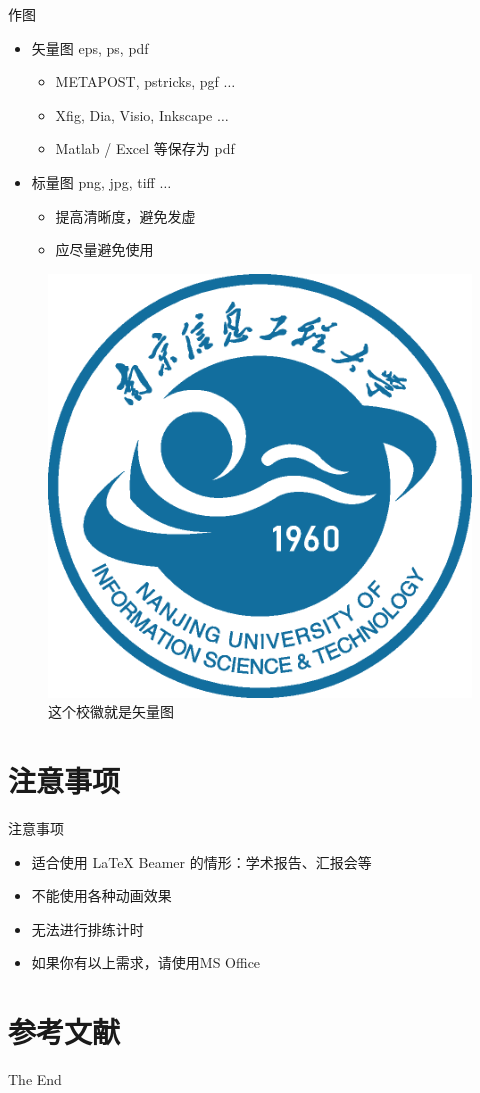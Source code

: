 \documentclass{beamer}
\begin{document}
\begin{frame}{作图}
    \begin{itemize}
        \item 矢量图 eps, ps, pdf
        \begin{itemize}
            \item METAPOST, pstricks, pgf $\ldots$
            \item Xfig, Dia, Visio, Inkscape $\ldots$
            \item Matlab / Excel 等保存为 pdf
        \end{itemize}
        \item 标量图 png, jpg, tiff $\ldots$
        \begin{itemize}
            \item 提高清晰度，避免发虚
            \item 应尽量避免使用
        \end{itemize}
    \end{itemize}
    \begin{figure}[htpb]
        \centering
        \includegraphics[width=0.2\linewidth]{pic/nuist_logo.eps}
        \caption{这个校徽就是矢量图}
    \end{figure}
\end{frame}

\section{注意事项}
\begin{frame}{注意事项}
    \begin{itemize}
        \item 适合使用 \LaTeX{} Beamer 的情形：学术报告、汇报会等
        \item 不能使用各种动画效果
        \item 无法进行排练计时
        \item 如果你有以上需求，请使用MS Office
    \end{itemize}
\end{frame}

\section{参考文献}

\begin{frame}[allowframebreaks]
    
    
\end{frame}

\begin{frame}
    \begin{center}
        {\Huge\calligra The End}
    \end{center}
\end{frame}
\end{document}
